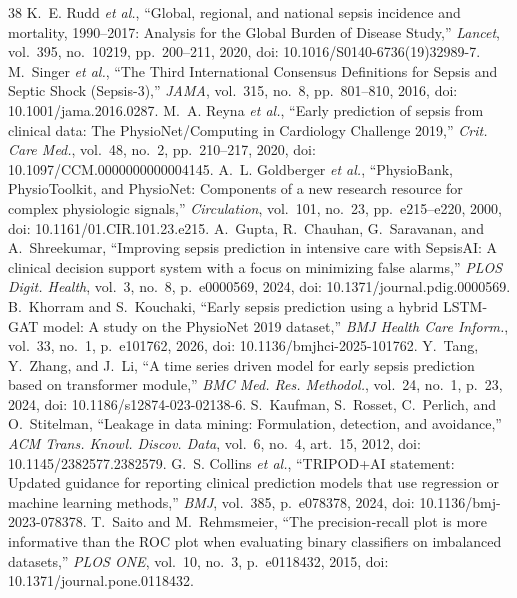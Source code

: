 \documentclass[preprint,12pt]{elsarticle}
\begin{document}
\FloatBarrier
\begin{thebibliography}{38}
 K.~E. Rudd \textit{et al.}, ``Global, regional, and national sepsis incidence and mortality, 1990--2017: Analysis for the Global Burden of Disease Study,'' \textit{Lancet}, vol.~395, no.~10219, pp.~200--211, 2020, doi: 10.1016/S0140-6736(19)32989-7.
 M.~Singer \textit{et al.}, ``The Third International Consensus Definitions for Sepsis and Septic Shock (Sepsis-3),'' \textit{JAMA}, vol.~315, no.~8, pp.~801--810, 2016, doi: 10.1001/jama.2016.0287.
 M.~A. Reyna \textit{et al.}, ``Early prediction of sepsis from clinical data: The PhysioNet/Computing in Cardiology Challenge 2019,'' \textit{Crit. Care Med.}, vol.~48, no.~2, pp.~210--217, 2020, doi: 10.1097/CCM.0000000000004145.
 A.~L. Goldberger \textit{et al.}, ``PhysioBank, PhysioToolkit, and PhysioNet: Components of a new research resource for complex physiologic signals,'' \textit{Circulation}, vol.~101, no.~23, pp.~e215--e220, 2000, doi: 10.1161/01.CIR.101.23.e215.
 A.~Gupta, R.~Chauhan, G.~Saravanan, and A.~Shreekumar, ``Improving sepsis prediction in intensive care with SepsisAI: A clinical decision support system with a focus on minimizing false alarms,'' \textit{PLOS Digit. Health}, vol.~3, no.~8, p.~e0000569, 2024, doi: 10.1371/journal.pdig.0000569.
 B.~Khorram and S.~Kouchaki, ``Early sepsis prediction using a hybrid LSTM-GAT model: A study on the PhysioNet 2019 dataset,'' \textit{BMJ Health Care Inform.}, vol.~33, no.~1, p.~e101762, 2026, doi: 10.1136/bmjhci-2025-101762.
 Y.~Tang, Y.~Zhang, and J.~Li, ``A time series driven model for early sepsis prediction based on transformer module,'' \textit{BMC Med. Res. Methodol.}, vol.~24, no.~1, p.~23, 2024, doi: 10.1186/s12874-023-02138-6.
 S.~Kaufman, S.~Rosset, C.~Perlich, and O.~Stitelman, ``Leakage in data mining: Formulation, detection, and avoidance,'' \textit{ACM Trans. Knowl. Discov. Data}, vol.~6, no.~4, art.~15, 2012, doi: 10.1145/2382577.2382579.
 G.~S. Collins \textit{et al.}, ``TRIPOD+AI statement: Updated guidance for reporting clinical prediction models that use regression or machine learning methods,'' \textit{BMJ}, vol.~385, p.~e078378, 2024, doi: 10.1136/bmj-2023-078378.
 T.~Saito and M.~Rehmsmeier, ``The precision-recall plot is more informative than the ROC plot when evaluating binary classifiers on imbalanced datasets,'' \textit{PLOS ONE}, vol.~10, no.~3, p.~e0118432, 2015, doi: 10.1371/journal.pone.0118432.

\end{thebibliography}
\end{document}
